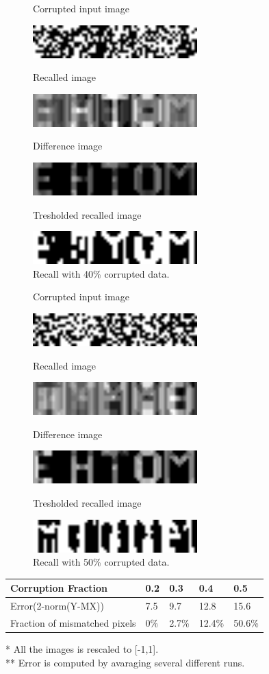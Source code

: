 \documentclass[epsfig]{article}
\def\spar{\vskip10pt}
\begin{document}
\begin{figure}[H] 
\centerline{Corrupted input image}
\centering\includegraphics[width=2.5in]{p44i.png} 
\centerline{Recalled image}
\centering\includegraphics[width=2.5in]{p44.png} 
\centerline{Difference image}
\centering\includegraphics[width=2.5in]{p44d.png}
\centerline{Tresholded recalled image}
\centering\includegraphics[width=2.5in]{p44o.png} 
\caption{Recall with 40\% corrupted data.   }\label{fig:2} 
\end{figure} 
\begin{figure}[H] 
\centerline{Corrupted input image}
\centering\includegraphics[width=2.5in]{p55i.png} 
\centerline{Recalled image}
\centering\includegraphics[width=2.5in]{p55.png} 
\centerline{Difference image}
\centering\includegraphics[width=2.5in]{p55d.png}
\centerline{Tresholded recalled image}
\centering\includegraphics[width=2.5in]{p55o.png} 
\caption{Recall with 50\% corrupted data.   }\label{fig:2} 
\end{figure} 
\begin{center}
	\begin{tabular}{| l | l | l | l | l|}
		\hline
		Corruption Fraction & 0.2 & 0.3 & 0.4 &0.5 \\ \hline
		Error(2-norm(Y-MX)) & 7.5 & 9.7 & 12.8 &15.6 \\ \hline
		Fraction of mismatched pixels& 0\% & 2.7\% & 12.4\% &50.6\%\\ \hline

	\end{tabular}
\end{center}
* All the images is rescaled to [-1,1].\\
** Error is computed by avaraging several different runs.
\spar
\end{document}

